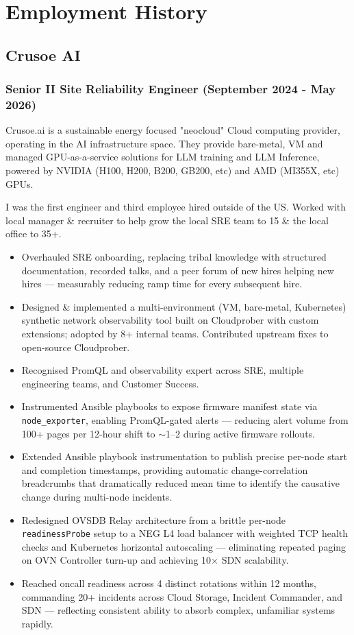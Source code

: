 \documentclass[a4paper, 10pt] {article}
\begin{document}
\newpage

\section*{Employment History}

\subsection*{Crusoe AI}

\subsubsection*{Senior II Site Reliability Engineer (September 2024 - May 2026)}

Crusoe.ai is a sustainable energy focused "neocloud" Cloud computing provider, operating in the AI infrastructure space. They provide bare-metal,
VM and managed GPU-as-a-service solutions for LLM training and LLM Inference, powered by NVIDIA (H100, H200, B200, GB200, etc)
and AMD (MI355X, etc) GPUs.

I was the first engineer and third employee hired outside of the US. Worked with local manager \& recruiter to help grow the local SRE team to 15
\& the local office to 35+.

\begin{itemize}[noitemsep]
	\item Overhauled SRE onboarding, replacing tribal knowledge with structured documentation, recorded talks, and a peer forum of new
		hires helping new hires --- measurably reducing ramp time for every subsequent hire.
	\item Designed \& implemented a multi-environment (VM, bare-metal, Kubernetes) synthetic network observability tool built on
		Cloudprober with custom extensions; adopted by 8+ internal teams. Contributed upstream fixes to open-source Cloudprober.
	\item Recognised PromQL and observability expert across SRE, multiple engineering teams, and Customer Success.
	\item Instrumented Ansible playbooks to expose firmware manifest state via \texttt{node\_exporter}, enabling PromQL-gated alerts ---
		reducing alert volume from 100+ pages per 12-hour shift to $\sim$1--2 during active firmware rollouts.
	\item Extended Ansible playbook instrumentation to publish precise per-node start and completion timestamps, providing automatic
		change-correlation breadcrumbs that dramatically reduced mean time to identify the causative change during multi-node incidents.
	\item Redesigned OVSDB Relay architecture from a brittle per-node \texttt{readinessProbe} setup to a NEG L4 load balancer with
		weighted TCP health checks and Kubernetes horizontal autoscaling --- eliminating repeated paging on OVN Controller turn-up
		and achieving 10$\times$ SDN scalability.
	\item Reached oncall readiness across 4 distinct rotations within 12 months, commanding 20+ incidents across Cloud Storage,
		Incident Commander, and SDN --- reflecting consistent ability to absorb complex, unfamiliar systems rapidly.
\end{itemize}
\end{document}
